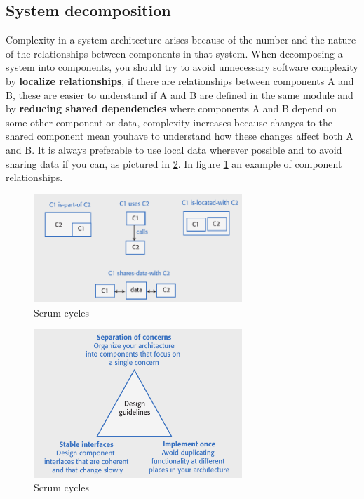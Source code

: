 \documentclass[10pt,a4paper]{report}
\begin{document}
\subsection{System decomposition}
Complexity in a system architecture arises because of the number and the nature of the relationships between components in that system. When decomposing a system into components, you should try to avoid
unnecessary software complexity by \textbf{localize relationships}, if there are relationships between components A and B, these are easier to understand if A and B are defined in the same module and by \textbf{reducing shared dependencies} where components A and B depend on some other component or data,
complexity increases because changes to the shared component mean youhave to understand how these changes affect both A and B.
It is always preferable to use local data wherever possible and to avoid sharing data if you can, as pictured in \ref{image27}. In figure \ref{image26} an example of component relationships.
 \begin{figure}[h]
	\centering
	\includegraphics[width=0.7\textwidth]{image26}
	\caption{Scrum cycles}
	\label{image26}
\end{figure}
 \begin{figure}[h]
	\centering
	\includegraphics[width=0.7\textwidth]{image27}
	\caption{Scrum cycles}
	\label{image27}
\end{figure}
\end{document}

